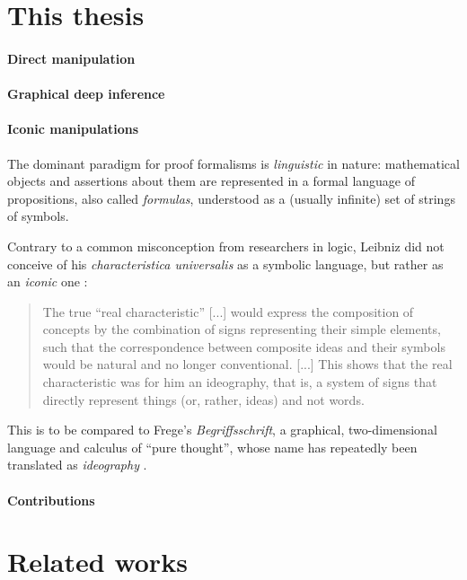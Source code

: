 \section{This thesis}

\paragraph{Direct manipulation}

\paragraph{Graphical deep inference}

\paragraph{Iconic manipulations}

The dominant paradigm for proof formalisms is \emph{linguistic} in nature:
mathematical objects and assertions about them are represented in a formal
language of propositions, also called \emph{formulas}, understood as a (usually
infinite) set of strings of symbols.

Contrary to a common misconception from researchers in logic, Leibniz did not
conceive of his \textit{characteristica universalis} as a symbolic language, but
rather as an \emph{iconic} one \cite[Chpt.~3]{logique_leibniz}:
\begin{quote}
    The true ``real characteristic'' [...] would express the composition of
    concepts by the combination of signs representing their simple elements,
    such that the correspondence between composite ideas and their symbols would
    be natural and no longer conventional. [...] This shows that the real
    characteristic was for him an ideography, that is, a system of signs that
    directly represent things (or, rather, ideas) and not words.
\end{quote}
This is to be compared to Frege's \textit{Begriffsschrift}, a graphical,
two-dimensional language and calculus of ``pure thought'', whose name has
repeatedly been translated as \emph{ideography}
.

\paragraph{Contributions}

\section{Related works}

